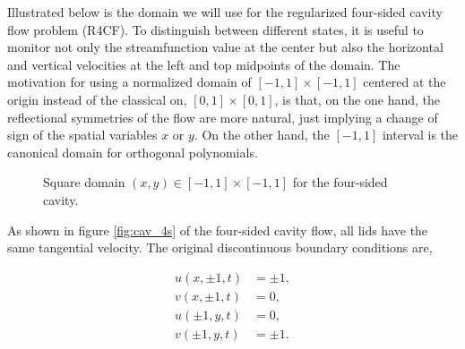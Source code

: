 Illustrated below is the domain we will use for the regularized four-sided
cavity flow problem (R4CF). To distinguish between different states, it is
useful to monitor not only the streamfunction value at the center but also the
horizontal and vertical velocities at the left and top midpoints of the domain.
The motivation for using a normalized domain of $[-1,1]\times[-1,1]$ centered
at the origin instead of the classical on, $[0,1]\times[0,1]$, is that, on the
one hand, the reflectional symmetries of the flow are more natural, just
implying a change of sign of the spatial variables $x$ or $y$. On the other
hand, the $[-1,1]$ interval is the canonical domain for orthogonal polynomials. 

\begin{figure}[ht]
\centering
{}
\caption{Square domain $(x,y) \in [-1,1]\times[-1,1]$ for the four-sided cavity.}
\label{fig:cav_domain}
\end{figure}

As shown in figure \ref{fig:cav_4s} of the four-sided cavity flow, all lids
have the same tangential velocity. The original discontinuous boundary
conditions are,

\begin{align}
u(x,\pm 1,t) &= \pm 1,\label{non_reg_u_bca} \\
v(x,\pm 1,t) &= 0, \\
u(\pm 1,y,t) &= 0, \\
v(\pm 1,y,t) &= \pm 1.\label{non_reg_u_bcb}
\end{align}

